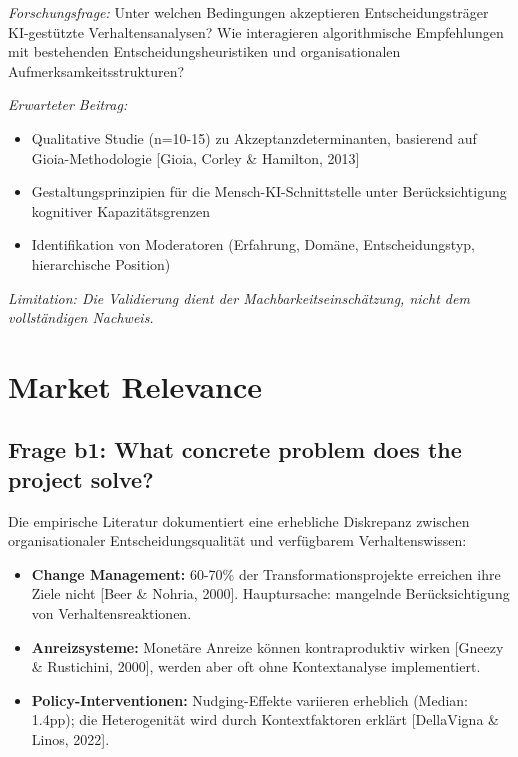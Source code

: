 \documentclass[11pt,a4paper]{article}
\newcommand{\limitation}[1]{\textcolor{limitation}{\textit{Limitation: #1}}}
\newcommand{\evidence}[1]{\textcolor{fehrgray}{[#1]}}
\begin{document}
\textit{Forschungsfrage:} Unter welchen Bedingungen akzeptieren Entscheidungsträger KI-gestützte Verhaltensanalysen? Wie interagieren algorithmische Empfehlungen mit bestehenden Entscheidungsheuristiken und organisationalen Aufmerksamkeitsstrukturen?

\textit{Erwarteter Beitrag:}
\begin{itemize}[leftmargin=2em]
    \item Qualitative Studie (n=10-15) zu Akzeptanzdeterminanten, basierend auf Gioia-Methodologie \evidence{Gioia, Corley \& Hamilton, 2013}
    \item Gestaltungsprinzipien für die Mensch-KI-Schnittstelle unter Berücksichtigung kognitiver Kapazitätsgrenzen
    \item Identifikation von Moderatoren (Erfahrung, Domäne, Entscheidungstyp, hierarchische Position)
\end{itemize}

\limitation{Die Validierung dient der Machbarkeitseinschätzung, nicht dem vollständigen Nachweis.}

\newpage
\section{Market Relevance}

\subsection{Frage b1: What concrete problem does the project solve?}

Die empirische Literatur dokumentiert eine erhebliche Diskrepanz zwischen organisationaler Entscheidungsqualität und verfügbarem Verhaltenswissen:

\begin{itemize}[leftmargin=2em]
    \item \textbf{Change Management:} 60-70\% der Transformationsprojekte erreichen ihre Ziele nicht \evidence{Beer \& Nohria, 2000}. Hauptursache: mangelnde Berücksichtigung von Verhaltensreaktionen.

    \item \textbf{Anreizsysteme:} Monetäre Anreize können kontraproduktiv wirken \evidence{Gneezy \& Rustichini, 2000}, werden aber oft ohne Kontextanalyse implementiert.

    \item \textbf{Policy-Interventionen:} Nudging-Effekte variieren erheblich (Median: 1.4pp); die Heterogenität wird durch Kontextfaktoren erklärt \evidence{DellaVigna \& Linos, 2022}.
\end{itemize}
\end{document}
